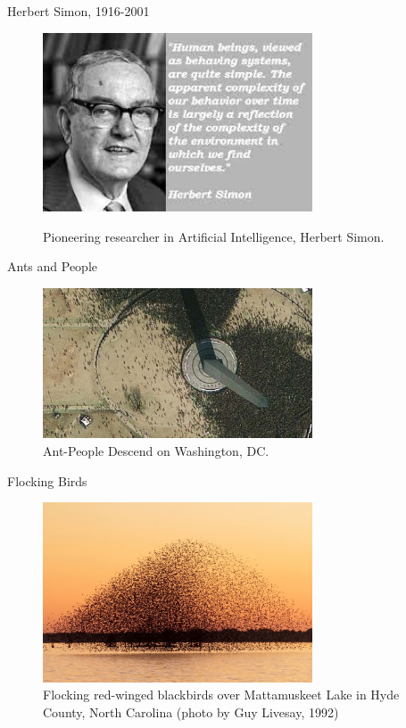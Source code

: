 \documentclass[handout]{beamer}
\begin{document}
\begin{frame}{Herbert Simon, 1916-2001}
\begin{figure}
\begin{center}
 \includegraphics[width=8cm]{images/herbertSimon01.jpg}
    
  \label{fig:herb}
  \citep{simon1996sciences}
  \caption{Pioneering researcher in Artificial Intelligence, Herbert Simon.}
\end{center}
\end{figure}
\end{frame}

\begin{frame}{Ants and People}
\begin{figure}
\begin{center}
 \includegraphics[width=8cm]{images/antsPeople.jpg}
  \caption{Ant-People Descend on Washington, DC.}
  \label{fig:ants}
\end{center}
\end{figure}
\citep{beaton2009ant}
\end{frame}


\begin{frame}{Flocking Birds}
\begin{figure}
  \begin{center}
  \includegraphics[width=8cm]{images/flocking01.jpg}
  \caption{Flocking red-winged blackbirds over Mattamuskeet Lake in Hyde County, North Carolina (photo by Guy Livesay, 1992)}
  \label{fig:flocking01}
  \end{center}  
\end{figure}
\end{frame}
\end{document}
